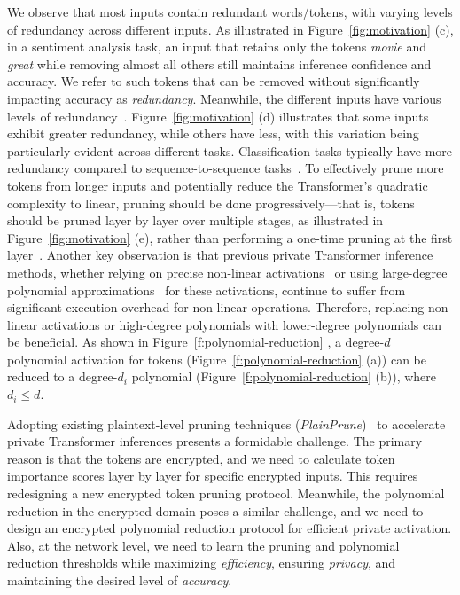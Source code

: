 We observe that most inputs contain redundant words/tokens, with varying levels of redundancy across different inputs. As illustrated in Figure~\ref{fig:motivation} (c), in a sentiment analysis task, an input that retains only the tokens \textit{movie} and \textit{great} while removing almost all others still maintains inference confidence and accuracy. We refer to such tokens that can be removed without significantly impacting accuracy as \textit{redundancy}. Meanwhile, the different inputs have various levels of redundancy~\citep{wang2021spatten,kim2022LTP,yudha2024boostcom}. Figure~\ref{fig:motivation} (d) illustrates that some inputs exhibit greater redundancy, while others have less, with this variation being particularly evident across different tasks. Classification tasks typically have more redundancy compared to sequence-to-sequence tasks~\citep{fu2024lazyllm}. To effectively prune more tokens from longer inputs and potentially reduce the Transformer's quadratic complexity to linear, pruning should be done progressively—that is, tokens should be pruned layer by layer over multiple stages, as illustrated in Figure~\ref{fig:motivation}
(e), rather than performing a one-time pruning at the first layer~\citep{wang2021spatten,kim2022LTP,xu2024freepruner}. Another key observation is that previous private Transformer inference methods, whether relying on precise non-linear activations~\citep{hao2022iron-iron,yudha2024boostcom} or using large-degree polynomial approximations~\citep{lu2023bumblebee, pang2023bolt} for these activations, continue to suffer from significant execution overhead for non-linear operations.
Therefore, replacing non-linear activations or high-degree polynomials with lower-degree polynomials can be beneficial. As shown in Figure~\ref{f:polynomial-reduction}
, a degree-$d$ polynomial activation for tokens (Figure~\ref{f:polynomial-reduction} (a)) can be reduced to a degree-$d_i$ polynomial (Figure~\ref{f:polynomial-reduction} (b)), where $d_i \leq d$. 







Adopting existing plaintext-level pruning techniques (\textit{PlainPrune})~\citep{wang2021spatten,kim2022LTP} to accelerate private Transformer inferences presents a formidable challenge. The primary reason is that the tokens are encrypted, and we need to calculate token importance scores layer by layer for specific encrypted inputs. This requires redesigning a new encrypted token pruning protocol. Meanwhile, the polynomial reduction in the encrypted domain poses a similar challenge, and we need to design an encrypted polynomial reduction protocol for efficient private activation. Also, at the network level, we need to learn the pruning and polynomial reduction thresholds while maximizing \textit{efficiency}, ensuring \textit{privacy}, and maintaining the desired level of \textit{accuracy}. 


